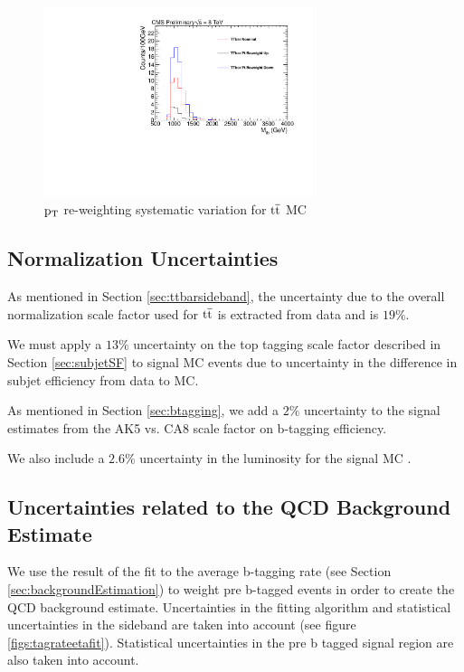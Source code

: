 \begin{figure}[htcb]
\begin{center}
\includegraphics[width=0.7\textwidth]{AN-13-004/figs/TTbar_PTReweighting}
\caption{
$\mathrm{p_{T}}$ re-weighting systematic variation for $\mathrm{t\overline{t}}$ MC 
}
\label{figs:ptreweight}
\end{center}
\end{figure}

\subsection{Normalization Uncertainties}
As mentioned in Section \ref{sec:ttbarsideband}, the uncertainty due to the overall normalization scale factor used for $\mathrm{t\overline{t}}$ is extracted from data and is $19\%$.   

We must apply a $13\%$ uncertainty on the top tagging scale factor described in Section \ref{sec:subjetSF} to signal MC events due to uncertainty in the difference in subjet efficiency from data to MC.

As mentioned in Section \ref{sec:btagging}, we add a $2\%$ uncertainty to the signal estimates from the AK5 vs. CA8 scale factor on b-tagging efficiency. 

We also include a $2.6\%$ uncertainty in the luminosity for the signal MC \cite{CMS-PAS-LUM-13-001}. 


\clearpage
\subsection{Uncertainties related to the QCD Background Estimate}
We use the result of the fit to the average b-tagging rate (see Section \ref{sec:backgroundEstimation}) to weight 
pre b-tagged events in order to create the QCD background estimate.  Uncertainties in
the fitting algorithm and statistical uncertainties in the sideband
are taken into account (see figure \ref{figs:tagrateetafit}).
Statistical uncertainties in the pre b tagged signal region are also
taken into account.

